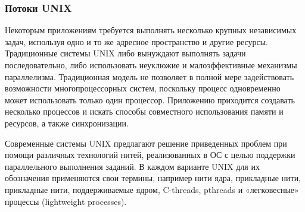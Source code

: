 \documentclass[a4paper,oneside,14pt]{extarticle}
\begin{document}
\subsubsection*{Потоки UNIX}

Некоторым приложениям требуется выполнять несколько крупных независимых задач, используя одно и то же адресное пространство и другие ресурсы. Традиционные системы UNIX либо вынуждают выполнять задачи последовательно, либо использовать неуклюжие и малоэффективные механизмы параллелизма. Традиционная модель не позволяет в полной мере задействовать возможности многопроцессорных систем, поскольку процесс одновременно может использовать только один процессор. Приложению приходится создавать несколько процессов и искать способы совместного использования памяти и ресурсов, а также синхронизации.

Современные системы UNIX предлагают решение приведенных проблем при помощи различных технологий нитей, реализованных в ОС с целью поддержки параллельного выполнения заданий. В каждом варианте UNIX для их обозначения применяются свои термины, например нити ядра, прикладные нити, прикладные нити, поддерживаемые ядром, C-threads, pthreads и «легковесные» процессы (lightweight processes).



\newpage

\subsection*{}



\end{document}
